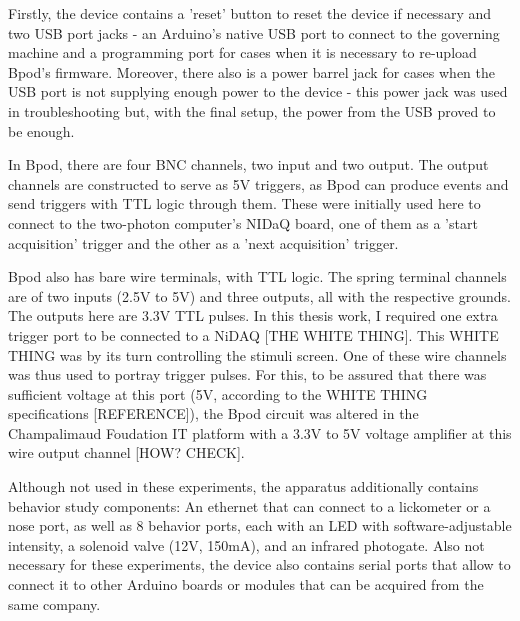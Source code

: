 Firstly, the device contains a 'reset' button to reset the device if necessary and two USB port jacks - an Arduino's native USB port to connect to the governing machine and a programming port for cases when it is necessary to re-upload Bpod's firmware. Moreover, there also is a power barrel jack for cases when the USB port is not supplying enough power to the device - this power jack was used in troubleshooting but, with the final setup, the power from the USB proved to be enough.


In Bpod, there are four BNC channels, two input and two output. The output channels are constructed to serve as 5V triggers, as Bpod can produce events and send triggers with TTL logic through them. These were initially used here to connect to the two-photon computer's NIDaQ board, one of them as a 'start acquisition' trigger and the other as a 'next acquisition' trigger. 

Bpod also has bare wire terminals, with TTL logic. The spring terminal channels are of two inputs (2.5V to 5V) and three outputs, all with the respective grounds. The outputs here are 3.3V TTL pulses. In this thesis work, I required one extra trigger port to be connected to a NiDAQ [THE WHITE THING]. This WHITE THING was by its turn controlling the stimuli screen. One of these wire channels was thus used to portray trigger pulses. For this, to be assured that there was sufficient voltage at this port (5V, according to the WHITE THING specifications [REFERENCE]), the Bpod circuit was altered in the Champalimaud Foudation IT platform with a 3.3V to 5V voltage amplifier at this wire output channel [HOW? CHECK].

Although not used in these experiments, the apparatus additionally contains behavior study components: An ethernet that can connect to a lickometer or a nose port, as well as 8 behavior ports, each with an LED with software-adjustable intensity, a solenoid valve (12V, 150mA), and an infrared photogate. Also not necessary for these experiments, the device also contains serial ports that allow to connect it to other Arduino boards or modules that can be acquired from the same company.



